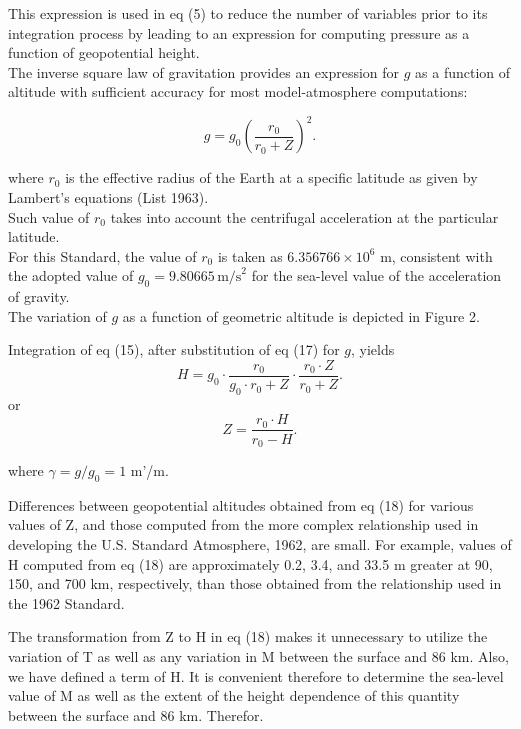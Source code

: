 \documentclass{article}
\begin{document}
This expression is used in eq (5) to reduce the number of variables prior to its integration process by leading to an expression for computing pressure as a function of geopotential height. \\

The inverse square law of gravitation provides an expression for \(g\) as a function of altitude with sufficient accuracy for most model-atmosphere computations:

\begin{equation}
 g = g_0 \left( \frac{r_0}{r_0 + Z} \right)^2. \tag{17}
\end{equation}

where \(r_0\) is the effective radius of the Earth at a specific latitude as given by Lambert's equations (List 1963). \\
Such value of \(r_0\) takes into account the centrifugal acceleration at the particular latitude. \\
For this Standard, the value of \(r_0\) is taken as \(6.356766 \times 10^6\) m, consistent with the adopted value of \(g_0 = 9.80665 \, \text{m/s}^2\) for the sea-level value of the acceleration of gravity. \\
The variation of \(g\) as a function of geometric altitude is depicted in Figure 2.


Integration of eq (15), after substitution of eq (17) for \(g\), yields
\begin{equation}
 H = g_0 \cdot \frac{r_0}{g_0 \cdot r_0 + Z} \cdot \frac{r_0 \cdot Z}{r_0 + Z}. \tag{18}
\end{equation}
or
\begin{equation}
 Z = \frac{r_0 \cdot H}{r_0 - H}. \tag{19}
\end{equation}

where \(\gamma = g/g_0 = 1\) m'/m.

Differences between geopotential altitudes obtained from eq (18) for various values of Z, and those computed from the more complex relationship used in developing the U.S. Standard Atmosphere, 1962, are small. For example, values of H computed from eq (18) are approximately 0.2, 3.4, and 33.5 m greater at 90, 150, and 700 km, respectively, than those obtained from the relationship used in the 1962 Standard.

The transformation from Z to H in eq (18) makes it unnecessary to utilize the variation of T as well as any variation in M between the surface and 86 km. Also, we have defined a term of H. It is convenient therefore to determine the sea-level value of M as well as the extent of the height dependence of this quantity between the surface and 86 km. Therefor.
\end{document}
